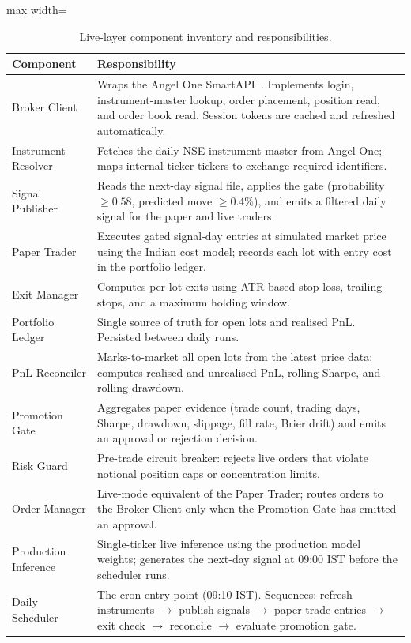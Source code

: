 \begin{table}[H]
\centering
\caption{Live-layer component inventory and responsibilities.}
\label{tab:live_layer_files}
\renewcommand{\arraystretch}{1.35}
\begin{adjustbox}{max width=\textwidth}
\begin{tabularx}{\textwidth}{l X}
\toprule
\textbf{Component} & \textbf{Responsibility} \\
\midrule
Broker Client        & Wraps the Angel One SmartAPI~\cite{angelone_smartapi}. Implements login, instrument-master lookup, order placement, position read, and order book read. Session tokens are cached and refreshed automatically. \\
Instrument Resolver  & Fetches the daily NSE instrument master from Angel One; maps internal ticker tickers to exchange-required identifiers. \\
Signal Publisher     & Reads the next-day signal file, applies the gate (probability $\geq 0.58$, predicted move $\geq 0.4\%$), and emits a filtered daily signal for the paper and live traders. \\
Paper Trader         & Executes gated signal-day entries at simulated market price using the Indian cost model; records each lot with entry cost in the portfolio ledger. \\
Exit Manager         & Computes per-lot exits using ATR-based stop-loss, trailing stops, and a maximum holding window. \\
Portfolio Ledger     & Single source of truth for open lots and realised PnL. Persisted between daily runs. \\
PnL Reconciler       & Marks-to-market all open lots from the latest price data; computes realised and unrealised PnL, rolling Sharpe, and rolling drawdown. \\
Promotion Gate       & Aggregates paper evidence (trade count, trading days, Sharpe, drawdown, slippage, fill rate, Brier drift) and emits an approval or rejection decision. \\
Risk Guard           & Pre-trade circuit breaker: rejects live orders that violate notional position caps or concentration limits. \\
Order Manager        & Live-mode equivalent of the Paper Trader; routes orders to the Broker Client only when the Promotion Gate has emitted an approval. \\
Production Inference & Single-ticker live inference using the production model weights; generates the next-day signal at 09:00 IST before the scheduler runs. \\
Daily Scheduler      & The cron entry-point (09:10 IST). Sequences: refresh instruments $\to$ publish signals $\to$ paper-trade entries $\to$ exit check $\to$ reconcile $\to$ evaluate promotion gate. \\
\bottomrule
\end{tabularx}
\end{adjustbox}
\end{table}

